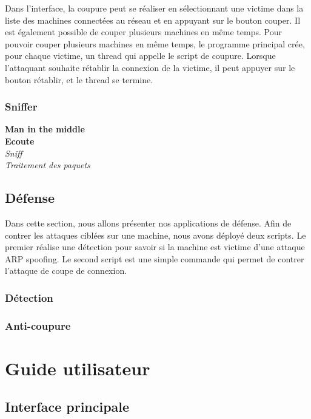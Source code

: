 \documentclass[11pt]{article}
\begin{document}
Dans l'interface, la coupure peut se réaliser en sélectionnant une victime dans la liste des machines connectées au réseau et en appuyant sur le bouton couper. Il est également possible de couper plusieurs machines en même temps. Pour pouvoir couper plusieurs machines en même temps, le programme principal crée, pour chaque victime, un thread qui appelle le script de coupure. Lorsque l'attaquant souhaite rétablir la connexion de la victime, il peut appuyer sur le bouton rétablir, et le thread se termine.

\subsubsection{Sniffer}

\textbf{Man in the middle}~\\

\textbf{Ecoute}~\\
\textit{Sniff}~\\

\textit{Traitement des paquets}~\\



\subsection{Défense}
Dans cette section, nous allons présenter nos applications de défense.
Afin de contrer les attaques ciblées sur une machine, nous avons déployé deux scripts. Le premier réalise une détection pour savoir si la machine est victime d'une attaque ARP spoofing. Le second script est une simple commande qui permet de contrer l'attaque de coupe de connexion.
\subsubsection{Détection}
\subsubsection{Anti-coupure}

\section{Guide utilisateur}
\subsection{Interface principale}
\end{document}
